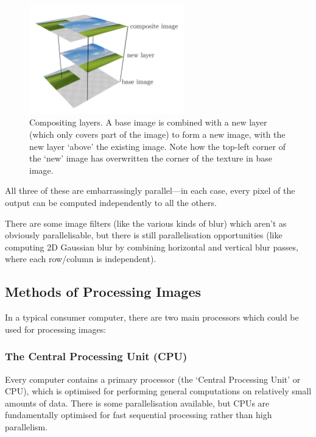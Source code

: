 \documentclass[12pt]{article}
\begin{document}
\begin{figure}
    \begin{center}
        \includegraphics[width=0.6\textwidth]{compositing}
    \end{center}
    \caption{Compositing layers.  A base image is combined with a new layer (which only covers part
    of the image) to form a new image, with the new layer `above' the existing image.  Note how the
    top-left corner of the `new' image has overwritten the corner of the texture in base
    image.}\label{fig:compositing}
\end{figure}

All three of these are embarrassingly parallel---in each case, every pixel of the output can be
computed independently to all the others.

There are some image filters (like the various kinds of blur) which aren't as obviously
parallelisable, but there is still parallelisation opportunities (like computing 2D Gaussian blur by
combining horizontal and vertical blur passes, where each row/column is independent).



\subsection{Methods of Processing Images}\label{sec:compute-types}

In a typical consumer computer, there are two main processors which could be used for processing
images:

\subsubsection{The Central Processing Unit (CPU)}\label{sec:cpu}

Every computer contains a primary processor (the `Central Processing Unit' or CPU), which is
optimised for performing general computations on relatively small amounts of data.  There is some
parallelisation available, but CPUs are fundamentally optimised for fast sequential processing
rather than high parallelism.
\end{document}
